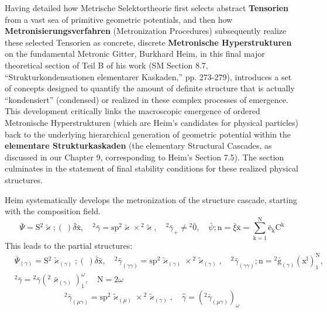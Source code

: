 \documentclass[12pt]{article}
\newcommand{\q}[1]{\enquote{#1}}
\begin{document}
Having detailed how Metrische Selektortheorie first selects abstract \textbf{Tensorien} from a vast sea of primitive geometric potentials, and then how \textbf{Metronisierungsverfahren} (Metronization Procedures) subsequently realize these selected Tensorien as concrete, discrete \textbf{Metronische Hyperstrukturen} on the fundamental Metronic Gitter, Burkhard Heim, in this final major theoretical section of Teil B of his work (SM Section 8.7, \q{Strukturkondensationen elementarer Kaskaden,} pp. 273-279), introduces a set of concepts designed to quantify the amount of definite structure that is actually \q{kondensiert} (condensed) or realized in these complex processes of emergence. This development critically links the macroscopic emergence of ordered Metronische Hyperstrukturen (which are Heim's candidates for physical particles) back to the underlying hierarchical generation of geometric potential within the \textbf{elementare Strukturkaskaden} (the elementary Structural Cascades, as discussed in our Chapter 9, corresponding to Heim's Section 7.5). The section culminates in the statement of final stability conditions for these realized physical structures.

Heim systematically develops the metronization of the structure cascade, starting with the composition field.
\begin{equation}
\bar{\Psi} = \mathrm{S}{}^2\tilde{\varkappa};(\ ) \bar{\delta}\bar{\mathrm{x}}, \quad {}^2\bar{\gamma} = \mathrm{sp}{}^2\tilde{\varkappa} \times {}^2\tilde{\varkappa}, \quad {}^2\bar{\gamma}_+ \neq {}^2\bar{0}, \quad \bar{\psi};\mathrm{n} = \bar{\xi} \bar{\mathrm{x}} = \sum_{\mathrm{k}=1}^\mathrm{N} \bar{\mathrm{e}}_\mathrm{k} \mathrm{C^k} \tag{89}
\end{equation}
This leads to the partial structures:
\begin{equation}
\begin{aligned}
& \bar{\Psi}_{(\gamma)} = \mathrm{S}{}^2\tilde{\varkappa}_{(\gamma)};(\ ) \bar{\delta}\bar{\mathrm{x}}, \quad {}^2\bar{\gamma}_{(\gamma\gamma)} = \mathrm{sp}{}^2\tilde{\varkappa}_{(\gamma)} \times {}^2\tilde{\varkappa}_{(\gamma)}, \quad {}^2\bar{\gamma}_{(\gamma\gamma)};\mathrm{n} = {}^2\bar{\mathrm{g}}_{(\gamma)}(\mathrm{x^l})_1^\mathrm{N}, \\
& {}^2\bar{\gamma} = {}^2\bar{\gamma}\left({}^2\bar{\varkappa}_{(\gamma)}\right)_1^\omega, \quad \mathrm{N} = 2\omega
\end{aligned} \tag{89a}
\end{equation}
\begin{equation}
{}^2\bar{\gamma}_{(\mu\gamma)} = \mathrm{sp}{}^2\tilde{\varkappa}_{(\mu)} \times {}^2\tilde{\varkappa}_{(\gamma)}, \quad \hat{\gamma} = \left( {}^2\bar{\gamma}_{(\mu\gamma)} \right)_\omega \tag{90}
\end{equation}
\end{document}
